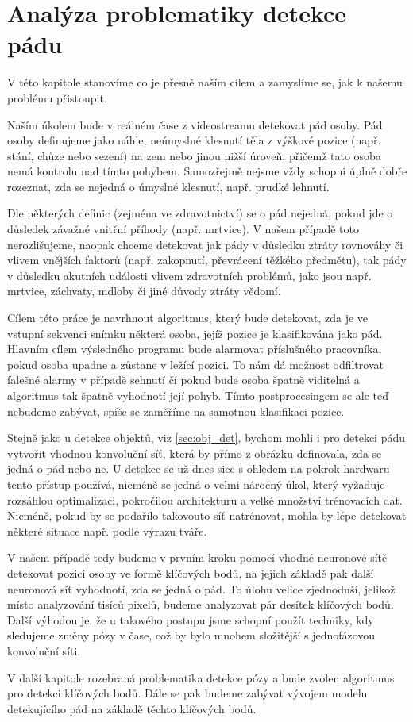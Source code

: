 \chapter{Analýza problematiky detekce pádu}
\label{sec:Goal}

V této kapitole stanovíme co je přesně naším cílem a zamyslíme se, jak k našemu
problému přistoupit.

Naším úkolem bude v reálném čase z videostreamu detekovat pád osoby. Pád osoby
definujeme jako náhle, neúmyslné klesnutí těla z výškové pozice (např. stání,
chůze nebo sezení) na zem nebo jinou nižší úroveň, přičemž tato osoba nemá
kontrolu nad tímto pohybem. Samozřejmě nejsme vždy schopni úplně dobře
rozeznat, zda se nejedná o úmyslné klesnutí, např. prudké lehnutí.

Dle některých definic (zejména ve zdravotnictví) se o pád nejedná, pokud jde o
důsledek závažné vnitřní příhody (např. mrtvice). V našem případě toto
nerozlišujeme, naopak chceme detekovat jak pády v důsledku ztráty rovnováhy či
vlivem vnějších faktorů (např. zakopnutí, převrácení těžkého předmětu), tak
pády v důsledku akutních události vlivem zdravotních problémů, jako jsou např.
mrtvice, záchvaty, mdloby či jiné důvody ztráty vědomí.

Cílem této práce je navrhnout algoritmus, který bude detekovat, zda je ve
vstupní sekvenci snímku některá osoba, jejíž pozice je klasifikována jako pád.
Hlavním cílem výsledného programu bude alarmovat příslušného pracovníka, pokud
osoba upadne a zůstane v ležící pozici. To nám dá možnost odfiltrovat falešné
alarmy v případě sehnutí čí pokud bude osoba špatně viditelná a algoritmus tak
špatně vyhodnotí její pohyb. Tímto postprocesingem se ale teď nebudeme zabývat,
spíše se zaměříme na samotnou klasifikaci pozice.

Stejně jako u detekce objektů, viz \ref{sec:obj_det}, bychom mohli i pro
detekci pádu vytvořit vhodnou konvoluční síť, která by přímo z obrázku
definovala, zda se jedná o pád nebo ne. U detekce se už dnes sice s ohledem na
pokrok hardwaru tento přístup používá, nicméně se jedná o velmi náročný úkol,
který vyžaduje rozsáhlou optimalizaci, pokročilou architekturu a velké množství
trénovacích dat. Nicméně, pokud by se podařilo takovouto síť natrénovat, mohla
by lépe detekovat některé situace např. podle výrazu tváře.

V našem případě tedy budeme v prvním kroku pomocí vhodné neuronové sítě
detekovat pozici osoby ve formě klíčových bodů, na jejich základě pak další
neuronová síť vyhodnotí, zda se jedná o pád. To úlohu velice zjednoduší,
jelikož místo analyzování tisíců pixelů, budeme analyzovat pár desítek
klíčových bodů. Další výhodou je, že u takového postupu jsme schopní použít
techniky, kdy sledujeme změny pózy v čase, což by bylo mnohem složitější s
jednofázovou konvoluční síti.

V další kapitole rozebraná problematika detekce pózy a bude zvolen algoritmus
pro detekci klíčových bodů. Dále se pak budeme zabývat vývojem modelu
detekujícího pád na základě těchto klíčových bodů.

